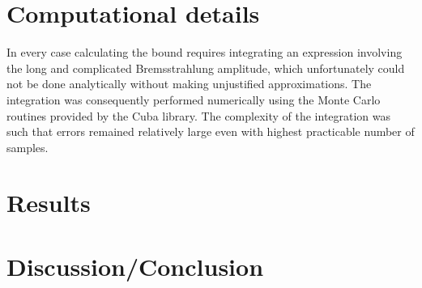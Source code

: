 \documentclass[10pt,a4paper]{article}
\begin{document}
	
	
	\section{Computational details}
	In every case calculating the bound requires integrating an expression involving the long and complicated Bremsstrahlung amplitude, which unfortunately could not be done analytically without making unjustified approximations. The integration was consequently performed numerically using the Monte Carlo routines provided by the Cuba library. The complexity of the integration was such that errors remained relatively large even with highest practicable number of samples. 
	\section{Results}
	\section{Discussion/Conclusion}	
	
	
%		
		
\end{document}
